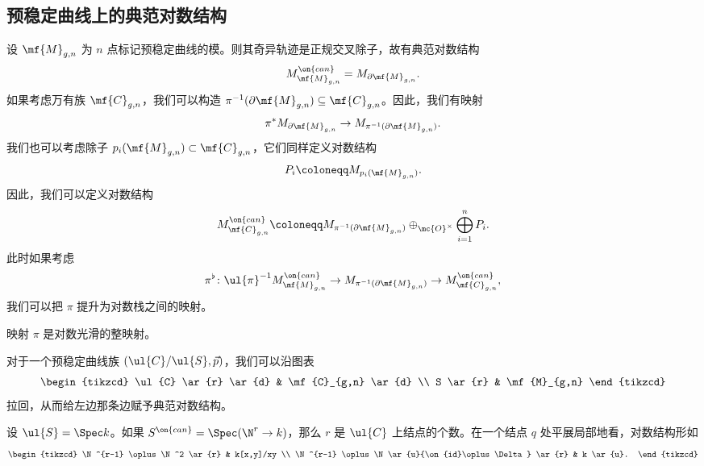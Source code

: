 \subsection{预稳定曲线上的典范对数结构}%
\label{sub:Canonical log structures on prestable curves}

设 \(\mf{M}_{g,n}\) 为 \(n\) 点标记预稳定曲线的模。则其奇异轨迹是正规交叉除子，故有典范对数结构
\[ M_{\mf{M}_{g,n}}^{\on{can}} = M_{\partial \mf{M}_{g,n}}. \]
如果考虑万有族 \(\mf{C}_{g,n}\)，我们可以构造 \(\pi^{-1}(\partial \mf{M}_{g,n}) \subseteq \mf{C}_{g,n}\)。因此，我们有映射
\[ \pi^* M_{\partial \mf{M}_{g,n}} \to M_{\pi^{-1}(\partial \mf{M}_{g,n})}. \]
我们也可以考虑除子 \(p_i(\mf{M}_{g,n}) \subset \mf{C}_{g,n}\)，它们同样定义对数结构
\[ P_i \coloneqq M_{p_i(\mf{M}_{g,n})}. \]
因此，我们可以定义对数结构
\[ M_{\mf{C}_{g,n}}^{\on{can}} \coloneqq M_{\pi^{-1}(\partial\mf{M}_{g,n})} \oplus_{\mc{O}^{\times}} \bigoplus_{i=1}^n P_i. \]
此时如果考虑
\[ \pi^{\flat} \colon \ul{\pi}^{-1} M_{\mf{M}_{g,n}}^{\on{can}} \to M_{\pi^{-1}(\partial \mf{M}_{g,n})} \to M_{\mf{C}_{g,n}}^{\on{can}}, \]
我们可以把 \(\pi\) 提升为对数栈之间的映射。

\begin{thm}
    映射 \(\pi\) 是对数光滑的整映射。
\end{thm}

\begin{defn}
    对于一个预稳定曲线族 \((\ul{C}/\ul{S}, \vec{p})\)，我们可以沿图表
    \begin{equation*}
    \begin{tikzcd}
        \ul{C} \ar{r} \ar{d} & \mf{C}_{g,n} \ar{d} \\
        S \ar{r} & \mf{M}_{g,n}
    \end{tikzcd}
    \end{equation*}
    拉回，从而给左边那条边赋予典范对数结构。
\end{defn}

\begin{rmk}
    设 \(\ul{S} = \Spec k\)。如果 \(S^{\on{can}} = \Spec (\N^r \to k)\)，那么 \(r\) 是 \(\ul{C}\) 上结点的个数。在一个结点 \(q\) 处平展局部地看，对数结构形如
    \begin{equation*}
    \begin{tikzcd}
        \N^{r-1} \oplus \N^2 \ar{r} & k[x,y]/xy \\
        \N^{r-1} \oplus \N \ar{u}{\on{id}\oplus\Delta} \ar{r} & k \ar{u}.
    \end{tikzcd}
    \end{equation*}
\end{rmk}

